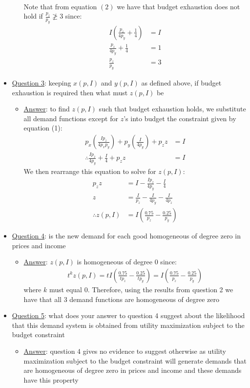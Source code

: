\documentclass{article}
\begin{document}
\begin{itemize}
\begin{itemize}
\begin{align*}
    \end{align*}
    Note that from equation $(2)$ we have that budget exhaustion does not hold if $\tfrac{p_{z}}{p_{y}} \ngeq 3$ since:
    \begin{align*}
      I(\frac{p_{z}}{4p_{y}} + \frac{1}{4}) &= I \\
      \frac{p_{z}}{4p_{y}} + \frac{1}{4} &= 1 \\
      \frac{p_{z}}{p_{y}} &= 3
    \end{align*}
  \end{itemize}
  \item  \underline{Question 3}: keeping $x(p,I)$ and $y(p,I)$ as defined above, if budget exhaustion is required then what must $z(p,I)$ be
  \begin{itemize}
    \item  \underline{Answer}: to find $z(p,I)$ such that budget exhaustion holds, we substitute all demand functions except for $z$'s into budget the constraint given by equation (1):
    \begin{align*}
      p_{x}(\frac{Ip_{z}}{4p_{x}p_{y}}) + p_{y}(\frac{I}{4p_{y}}) + p_{z}z &= I \\
      \therefore \frac{Ip_{z}}{4p_{y}} + \frac{I}{4} + p_{z}z &= I
    \end{align*}
    We then rearrange this equation to solve for $z(p,I)$:
    \begin{align*}
      p_{z}z &= I - \frac{Ip_{z}}{4p_{y}} - \frac{I}{4} \\
      z &= \frac{I}{p_{z}} - \frac{I}{4p_{y}} - \frac{I}{4p_{z}} \\
      \therefore z(p,I) &= I(\frac{0.75}{p_{z}} - \frac{0.25}{p_{y}})
    \end{align*}
  \end{itemize}
  \item  \underline{Question 4}: is the new demand for each good homogeneous of degree zero in prices and income
  \begin{itemize}
    \item  \underline{Answer}: $z(p,I)$ is homogeneous of degree 0 since:
    \begin{gather*}
      t^{k}z(p,I) = tI (\frac{0.75}{tp_{z}} - \frac{0.25}{tp_{y}}) = I (\frac{0.75}{p_{z}} - \frac{0.25}{p_{y}})
    \end{gather*}
    where $k$ must equal 0. Therefore, using the results from question 2 we have that all 3 demand functions are homogeneous of degree zero
  \end{itemize}
  \item  \underline{Question 5}: what does your answer to question 4 suggest about the likelihood that this demand system is obtained from utility maximization subject to the budget constraint
  \begin{itemize}
    \item  \underline{Answer}: question 4 gives no evidence to suggest otherwise as utility maximization subject to the budget constraint will generate demands that are homogeneous of degree zero in prices and income and these demands have this property
  \end{itemize}
\end{itemize}
\end{document}
